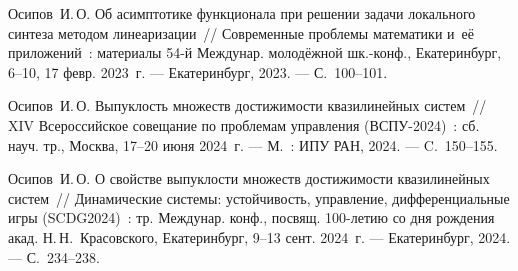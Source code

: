 \documentclass[../main.tex]{subfiles}
\begin{document}
\begin{thebibliography}{99}
Осипов~И.\,О. Об асимптотике функционала при решении задачи локального синтеза методом линеаризации~// Современные проблемы математики и~её приложений~: материалы 54-й Междунар. молодёжной шк.-конф., Екатеринбург, 6--10, 17 февр. 2023~г. --- Екатеринбург, 2023. --- С.~100--101.

Осипов~И.\,О. Выпуклость множеств достижимости квазилинейных систем~// XIV Всероссийское совещание по проблемам управления (ВСПУ-2024)~: сб. науч. тр., Москва, 17--20 июня 2024~г. --- М.~: ИПУ РАН, 2024. --- C.~150--155.

Осипов~И.\,О. О свойстве выпуклости множеств достижимости квазилинейных систем~// Динамические системы: устойчивость, управление, дифференциальные игры (SCDG2024)~: тр. Междунар. конф., посвящ. 100-летию со дня рождения акад. Н.\,Н.~Красовского, Екатеринбург, 9--13 сент. 2024~г. --- Екатеринбург, 2024. --- С.~234--238. 









%


\end{thebibliography}
\end{document}
